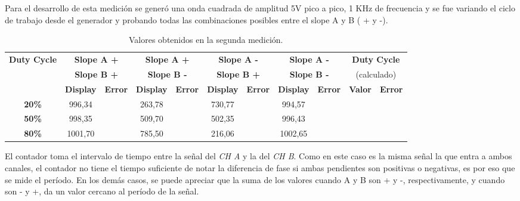 \documentclass{article}
\begin{document}
	Para el desarrollo de esta medición se generó una onda cuadrada de amplitud 5V pico a pico, 1 KHz de frecuencia y se fue variando el ciclo de trabajo desde el generador y probando todas las combinaciones posibles entre el slope A y B ( + y -). 
\bigskip


\begin{table}[!hbt]
	\begin{center}

		\begin{tabular}{|c|c|c|c|c|c|c|c|c|c|c|} \hline
			\multirow{3}{*}{\textbf{Duty Cycle}}
			& \multicolumn{2}{c|}{\textbf{Slope A +}} & \multicolumn{2}{c|}{\textbf{Slope A +}} & \multicolumn{2}{c|}{\textbf{Slope A -}} & \multicolumn{2}{c|}{\textbf{Slope A -}} & \multicolumn{2}{c|}{\textbf{Duty Cycle}} \\
			& \multicolumn{2}{c|}{\textbf{Slope B +}} & \multicolumn{2}{c|}{\textbf{Slope B -}} & \multicolumn{2}{c|}{\textbf{Slope B +}} & \multicolumn{2}{c|}{\textbf{Slope B -}} & \multicolumn{2}{c|}{(calculado)} \\\cline{2-11}
			& \textbf{Display} & \textbf{Error} & \textbf{Display} & \textbf{Error} & \textbf{Display} & \textbf{Error} & \textbf{Display} & \textbf{Error} & \textbf{Valor} & \textbf{Error} \\\hline
			
			\textbf{20\%} & 996,34 &  & 263,78 &  & 730,77 &  & 994,57 &  &  &  \\\hline
			\textbf{50\%} & 998,35 &  & 509,70 &  & 502,35 &  & 996,43 &  &  &  \\\hline
			\textbf{80\%} & 1001,70 &  & 785,50 &  & 216,06 &  & 1002,65 &  &  &  \\\hline
		\end{tabular}

	\caption{Valores obtenidos en la segunda medición.}
	\end{center}
\end{table}
\medskip
	
El contador toma el intervalo de tiempo entre la señal del \textit{CH A} y la del \textit{CH B}. Como en este caso es la misma señal la que entra a ambos canales, el contador no tiene el tiempo suficiente de notar la diferencia de fase si ambas pendientes son positivas o negativas, es por eso que se mide el período. En los demás casos, se puede apreciar que la suma de los valores cuando A y B son + y -, respectivamente, y cuando son - y +, da un valor cercano al período de la señal.


\end{document}
